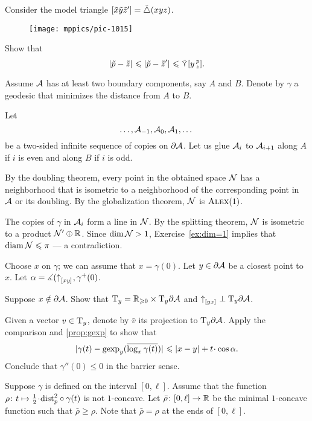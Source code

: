 Consider the model triangle $[\tilde x\tilde y\tilde z']=\tilde\triangle(xyz)$.
\begin{figure}[ht!]
\vskip-0mm
\centering
\texttt{[image: mppics/pic-1015]}
\end{figure}

Show that 
\[|{\tilde p}-{\tilde z}|_{}^{{}}\leqslant |{\tilde p}-{\tilde z'}|_{}^{{}}\leqslant\mathop{\tilde\curlyvee}\nolimits[y\,{}^{p}_{z}].\]


Assume $\mathcal{A}$ has at least two boundary components, say $A$ and $B$.
Denote by $\gamma$ a geodesic that minimizes the distance from $A$ to $B$.

Let 
\[\dots,\mathcal{A}_{-1},\mathcal{A}_{0},\mathcal{A}_{1},\dots\]
be a two-sided infinite sequence of copies on $\partial\mathcal{A}$.
Let us glue $\mathcal{A}_{i}$ to $\mathcal{A}_{i+1}$ along $A$ if $i$ is even and along $B$ if $i$ is odd.

By the doubling theorem, every point in the obtained space $\mathcal{N}$ has a neighborhood that is isometric to a neighborhood of the corresponding point in $\mathcal{A}$ or its doubling.
By the globalization theorem, $\mathcal{N}$ is $\textsc{Alex}(1)$.

The copies of $\gamma$ in $\mathcal{A}_{i}$ form a line in $\mathcal{N}$.
By the splitting theorem, $\mathcal{N}$ is isometric to a product $\mathcal{N}'\oplus \mathbb{R}$.
Since $\operatorname{\rm dim}\nolimits\mathcal{N}>1$, Exercise~\ref{ex:dim=1} implies that $\operatorname{\rm diam}\nolimits\mathcal{N}\leqslant \pi$ --- a contradiction.

 Choose $x$ on $\gamma$;
we can assume that $x=\gamma(0)$.
Let $y\in \partial \mathcal{A}$ be a closest point to $x$.
Let $\alpha=\measuredangle({\uparrow}_{[{x}{y}]_{{}}},\gamma^+(0)$.

Suppose $x\notin \partial \mathcal{A}$.
Show that $\mathrm{T}_y=\mathbb{R}_{\geqslant0}\times\mathrm{T}_y\partial \mathcal{A}$
and ${\uparrow}_{[{y}{x}]_{{}}}\perp \mathrm{T}_y\partial \mathcal{A}$.

Given a vector $v\in \mathrm{T}_y$, denote by $\bar v$ its projection to $\mathrm{T}_y\partial \mathcal{A}$.
Apply the comparison and \ref{prop:gexp} to show that 
\[\dist{\gamma(t)}{\gexp_y(\overline{\log_x\gamma(t)})}{}\le \dist{x}{y}{}+t\cdot\cos\alpha.\]
Conclude that $\gamma''(0)\le 0$ in the barrier sense.


Suppose $\gamma$ is defined on the interval $[0,\ell]$.
Assume that the function $\rho\:t\mapsto \tfrac12\cdot\distfun_p^2\circ\gamma(t)$ is not $1$-concave.
Let $\bar\rho\colon[0,\ell]\to\mathbb{R}$ be the minimal $1$-concave function such that $\bar\rho\ge \rho$.
Note that $\bar\rho=\rho$ at the ends of $[0,\ell]$.

